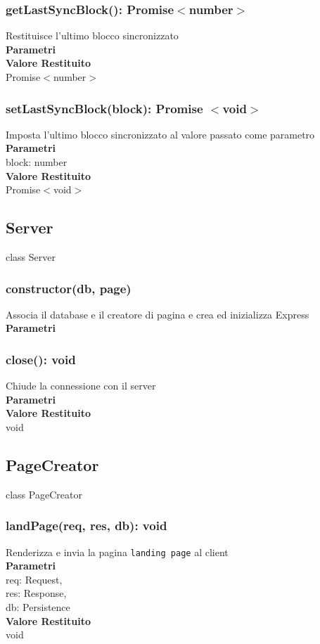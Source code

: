 \documentclass[a4paper, 12pt]{article}
\begin{document}
\subsubsection{getLastSyncBlock(): Promise$<$number$>$}
Restituisce l'ultimo blocco sincronizzato\\
\textbf{Parametri}\\
\textbf{Valore Restituito}\\
Promise$<$number$>$
\subsubsection{setLastSyncBlock(block): Promise $<$void$>$}
Imposta l'ultimo blocco sincronizzato al valore passato come parametro\\
\textbf{Parametri}\\
block: number\\
\textbf{Valore Restituito}\\
Promise$<$void$>$

\subsection{Server}
class Server
\subsubsection{constructor(db, page)}
Associa il database e il creatore di pagina e crea ed inizializza Express\\
\textbf{Parametri}\\
\subsubsection{close(): void}
Chiude la connessione con il server\\
\textbf{Parametri}\\
\textbf{Valore Restituito}\\
void

\subsection{PageCreator}
class PageCreator
\subsubsection{landPage(req, res, db): void} 
Renderizza e invia la pagina \texttt{landing page} al client\\
\textbf{Parametri}\\
req: Request,\\
res: Response,\\
db: Persistence\\
\textbf{Valore Restituito}\\
void
\end{document}
